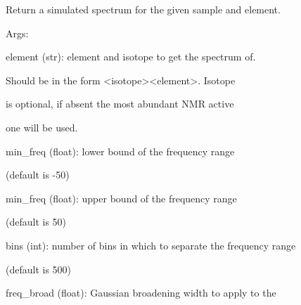 \documentclass[letterpaper,10pt,english]{sphinxmanual}
\begin{document}
\begin{fulllineitems}

\begin{fulllineitems}
\label{doctree/soprano.calculate.nmr.nmr:soprano.calculate.nmr.nmr.NMRCalculator.spectrum_1d}
Return a simulated spectrum for the given sample and element.

\begin{DUlineblock}{0em}
\item[] Args:
\item[]
\begin{DUlineblock}{\DUlineblockindent}
\item[] element (str): element and isotope to get the spectrum of.
\item[]
\begin{DUlineblock}{\DUlineblockindent}
\item[] Should be in the form \textless{}isotope\textgreater{}\textless{}element\textgreater{}. Isotope
\item[] is optional, if absent the most abundant NMR active
\item[] one will be used.
\end{DUlineblock}
\item[] min\_freq (float): lower bound of the frequency range
\item[]
\begin{DUlineblock}{\DUlineblockindent}
\item[] (default is -50)
\end{DUlineblock}
\item[] min\_freq (float): upper bound of the frequency range
\item[]
\begin{DUlineblock}{\DUlineblockindent}
\item[] (default is 50)
\end{DUlineblock}
\item[] bins (int): number of bins in which to separate the frequency range
\item[]
\begin{DUlineblock}{\DUlineblockindent}
\item[] (default is 500)
\end{DUlineblock}
\item[] freq\_broad (float): Gaussian broadening width to apply to the

\end{DUlineblock}
\end{DUlineblock}
\end{fulllineitems}
\end{fulllineitems}
\end{document}
